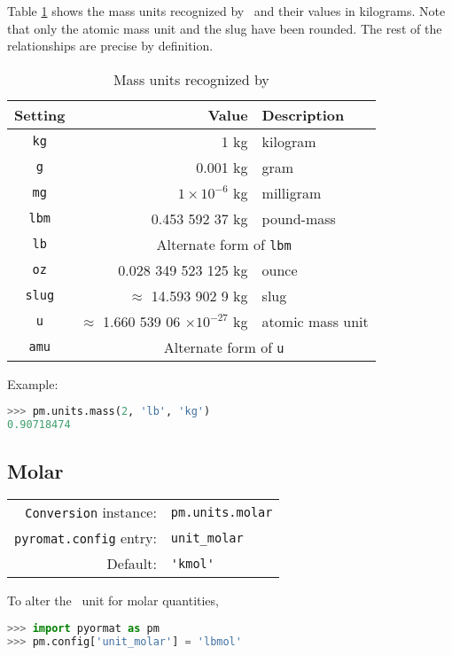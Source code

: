 Table \ref{tab:mass} shows the mass units recognized by \PM\ and their values in kilograms.  Note that only the atomic mass unit and the slug have been rounded.  The rest of the relationships are precise by definition.

\begin{table}
\centering
\caption{Mass units recognized by \PM}\label{tab:mass}
\begin{tabular}{crl}
\hline
Setting & Value & Description\\
\hline
\verb|kg| & 1 kg & kilogram\\
\verb|g| & 0.001 kg & gram\\
\verb|mg| & $1\times 10^{-6}$ kg & milligram\\
\verb|lbm| & 0.453 592 37 kg & pound-mass\\
\verb|lb| & \multicolumn{2}{c}{Alternate form of \texttt{lbm}}\\
\verb|oz| & 0.028 349 523 125 kg & ounce\\
\verb|slug| & $\approx$ 14.593 902 9 kg & slug\\
\verb|u| & $\approx$ 1.660 539 06 $\times 10^{-27}$ kg & atomic mass unit\\
\verb|amu| & \multicolumn{2}{c}{Alternate form of \texttt{u}}\\
\hline
\end{tabular}
\end{table}

Example:
\begin{lstlisting}[language=Python]
>>> pm.units.mass(2, 'lb', 'kg')
0.90718474
\end{lstlisting}


%
%

\subsection{Molar}\label{sec:units:molar}

\begin{tabular}{rl}
\hline
\verb|Conversion| instance: & \verb|pm.units.molar|\\
\verb|pyromat.config| entry: & \verb|unit_molar|\\
Default: & \verb|'kmol'|\\
\hline
\end{tabular}
\vspace{1em}

To alter the \PM\ unit for molar quantities,
\begin{lstlisting}[language=Python]
>>> import pyormat as pm
>>> pm.config['unit_molar'] = 'lbmol'
\end{lstlisting}


